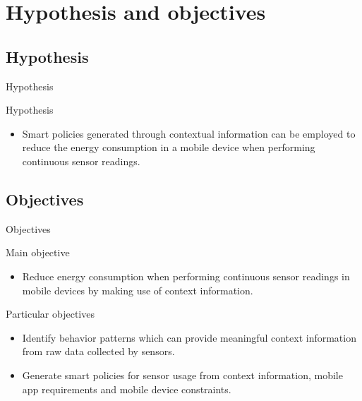 \section{Hypothesis and objectives}


\subsection{Hypothesis}

\begin{frame}{Hypothesis}
  \begin{exampleblock}{Hypothesis}
    \begin{itemize}
      \item Smart policies generated through contextual information can be employed to reduce the energy consumption in a mobile device when performing continuous sensor readings.
    \end{itemize}    
  \end{exampleblock}
\end{frame}


\subsection{Objectives}

\begin{frame}{Objectives}
  \begingroup
    
    \begin{block}{Main objective}
      \begin{itemize}
        \item Reduce energy consumption when performing continuous sensor readings in mobile devices by making use of context information.
      \end{itemize}
      
    \end{block}

    \begin{block}{Particular objectives}
      \begin{itemize}
        \item Identify behavior patterns which can provide meaningful context information from raw data collected by sensors.
        \item Generate smart policies for sensor usage from context information, mobile app requirements and mobile device constraints.
      \end{itemize}
    \end{block}
  \endgroup
\end{frame}